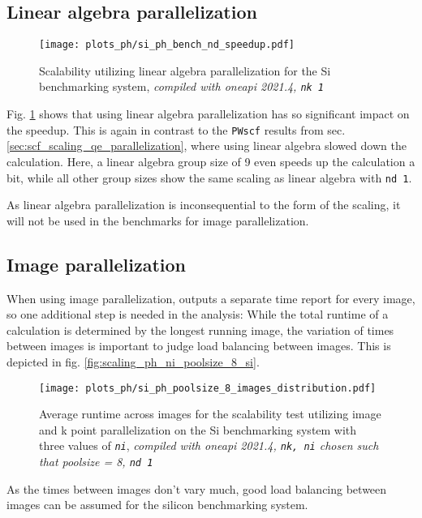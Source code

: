 \documentclass[main.tex]{subfiles}
\begin{document}
\subsection{Linear algebra parallelization}

\begin{figure}[htb!]
    \centering
    \texttt{[image: plots\_ph/si\_ph\_bench\_nd\_speedup.pdf]}
    \caption{Scalability utilizing linear algebra parallelization for the Si benchmarking system, \emph{\QE compiled with \gls{oneapi} 2021.4, \texttt{nk 1}}}
    \label{fig:scaling_ph_nd_si}
\end{figure}
Fig. \ref{fig:scaling_ph_nd_si} shows that using linear algebra parallelization has so significant impact on the speedup.
This is again in contrast to the \texttt{PWscf} results from sec. \ref{sec:scf_scaling_qe_parallelization}, where using linear algebra slowed down the calculation.
Here, a linear algebra group size of 9 even speeds up the calculation a bit, while all other group sizes show the same scaling as linear algebra with \texttt{nd 1}.

As linear algebra parallelization is inconsequential to the form of the scaling, it will not be used in the benchmarks for image parallelization.

\subsection{Image parallelization}\label{sub:scaling_ph_images}

When using image parallelization, \QE outputs a separate time report for every image, so one additional step is needed in the analysis:
While the total runtime of a calculation is determined by the longest running image, the variation of times between images is important to judge load balancing between images.
This is depicted in fig. \ref{fig:scaling_ph_ni_poolsize_8_si}.

\begin{figure}[htb!]
    \centering
    \texttt{[image: plots\_ph/si\_ph\_poolsize\_8\_images\_distribution.pdf]}
    \caption{Average runtime across images for the scalability test utilizing image and k point parallelization on the Si benchmarking system with three values of \emph{\texttt{ni}}, \emph{\QE compiled with \gls{oneapi} 2021.4, \texttt{nk, ni} chosen such that poolsize = 8, \texttt{nd 1}}}
    \label{fig:scaling_ph_ni_poolsize_8_si_distribution}
\end{figure}
As the times between images don't vary much, good load balancing between images can be assumed for the silicon benchmarking system.
\end{document}
